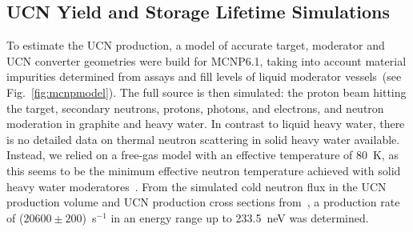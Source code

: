 

\subsection{UCN Yield and Storage Lifetime Simulations}
To estimate the UCN production, a model of accurate target, moderator
and UCN converter geometries were build for MCNP6.1, taking into
account material impurities determined from assays and fill levels of
liquid moderator vessels~(see Fig.~\ref{fig:mcnpmodel}). The full
source is then simulated: the proton beam hitting the target,
secondary neutrons, protons, photons, and electrons, and neutron
moderation in graphite and heavy water. In contrast to liquid heavy
water, there is no detailed data on thermal neutron scattering in
solid heavy water available. Instead, we relied on a free-gas model
with an effective temperature of 80~K, as this seems to be the minimum
effective neutron temperature achieved with solid heavy water
moderatores~\cite{rush1966}. From the simulated cold neutron flux in the UCN
production volume and UCN production cross sections
from~\cite{Schmidt2015,Korobkina2002}, a production rate of
($20600\pm 200$)~s$^{-1}$ in an energy range up to 233.5~neV was
determined.

